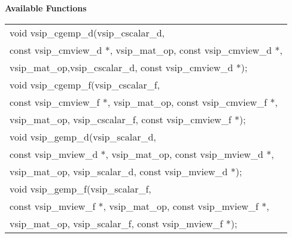 \\\cvsiplh
\\ \hspace*{.8cm} \vspace*{.1cm} \textbf{Available Functions }
\\ \hspace*{1.1cm} {
\ttfamily
\begin{tabular}[H]{l}
void vsip\_cgemp\_d(vsip\_cscalar\_d,\\*\hspace{.6cm}const vsip\_cmview\_d *, vsip\_mat\_op, const vsip\_cmview\_d *,\\*\hspace{.6cm}vsip\_mat\_op,vsip\_cscalar\_d, const vsip\_cmview\_d *);\\
void vsip\_cgemp\_f(vsip\_cscalar\_f,\\*\hspace{.6cm}const vsip\_cmview\_f *, vsip\_mat\_op, const vsip\_cmview\_f *,\\*\hspace{.6cm}vsip\_mat\_op, vsip\_cscalar\_f, const vsip\_cmview\_f *);\\
void vsip\_gemp\_d(vsip\_scalar\_d,\\*\hspace{.6cm}const vsip\_mview\_d *, vsip\_mat\_op, const vsip\_mview\_d *,\\*\hspace{.6cm}vsip\_mat\_op, vsip\_scalar\_d, const vsip\_mview\_d *);\\
void vsip\_gemp\_f(vsip\_scalar\_f,\\*\hspace{.6cm}const vsip\_mview\_f *, vsip\_mat\_op, const vsip\_mview\_f *,\\*\hspace{.6cm}vsip\_mat\_op, vsip\_scalar\_f, const vsip\_mview\_f *);\\
\end{tabular}
}
\\\pyjvsiph
{}
